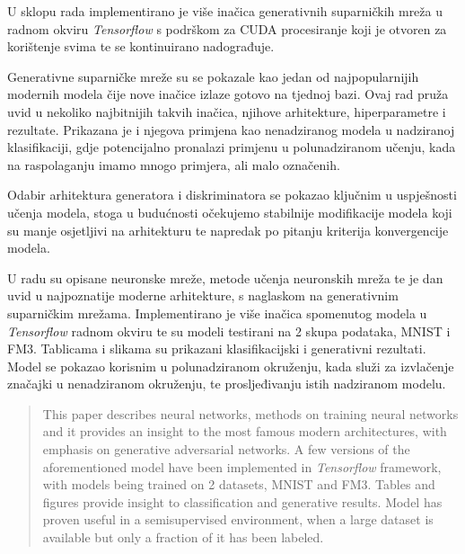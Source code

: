 \documentclass[times, utf8, diplomski]{fer}
\begin{document}
U sklopu rada implementirano je više inačica generativnih suparničkih mreža u radnom okviru \textit{Tensorflow} s podrškom za CUDA procesiranje koji je otvoren za korištenje svima te se kontinuirano nadograđuje. \par

Generativne suparničke mreže su se pokazale kao jedan od najpopularnijih modernih modela čije nove inačice izlaze gotovo na tjednoj bazi. Ovaj rad pruža uvid u nekoliko najbitnijih takvih inačica, njihove arhitekture, hiperparametre i rezultate. Prikazana je i njegova primjena kao nenadziranog modela u nadziranoj klasifikaciji, gdje potencijalno pronalazi primjenu u polunadziranom učenju, kada na raspolaganju imamo mnogo primjera, ali malo označenih. \par

Odabir arhitektura generatora i diskriminatora se pokazao ključnim u uspješnosti učenja modela, stoga u budućnosti očekujemo stabilnije modifikacije modela koji su manje osjetljivi na arhitekturu te napredak po pitanju kriterija konvergencije modela. \par




\begin{sazetak}
U radu su opisane neuronske mreže, metode učenja neuronskih mreža te je dan uvid u najpoznatije moderne arhitekture, s naglaskom na generativnim suparničkim mrežama. Implementirano je više inačica spomenutog modela u \textit{Tensorflow} radnom okviru te su modeli testirani na 2 skupa podataka, MNIST i FM3. Tablicama i slikama su prikazani klasifikacijski i generativni rezultati. Model se pokazao korisnim u polunadziranom okruženju, kada služi za izvlačenje značajki u nenadziranom okruženju, te prosljeđivanju istih nadziranom modelu. 

\end{sazetak}

\begin{abstract}
This paper describes neural networks, methods on training neural networks and it provides an insight to the most famous modern architectures, with emphasis on generative adversarial networks. A few versions of the aforementioned model have been implemented in \textit{Tensorflow} framework, with models being trained on 2 datasets, MNIST and FM3. Tables and figures provide insight to classification and generative results. Model has proven useful in a semisupervised environment, when a large dataset is available but only a fraction of it has been labeled.

\end{abstract}
\end{document}
